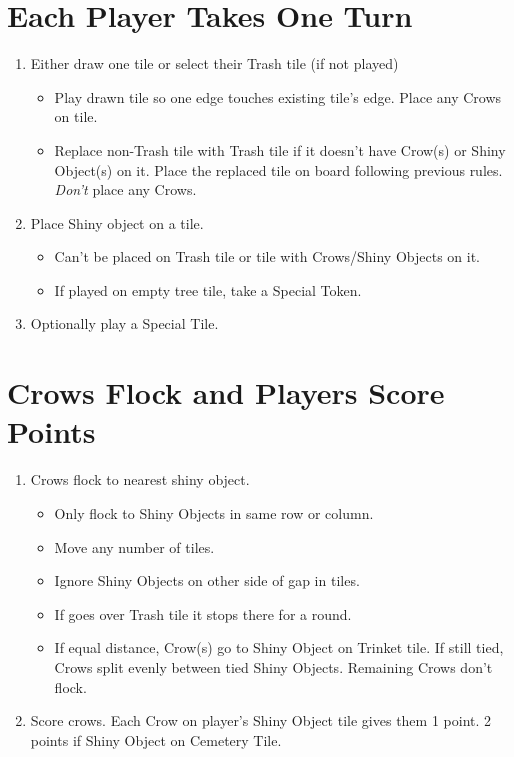\documentclass[12pt]{article}
\newenvironment{enumerateCustom}
{\begin{enumerate}
  \setlength{\itemsep}{1pt}
  \setlength{\parskip}{0pt}
  \setlength{\parsep}{0pt}}
{\end{enumerate}}
\newenvironment{itemizeCustom}
{\begin{itemize}
  \setlength{\itemsep}{1pt}
  \setlength{\parskip}{0pt}
  \setlength{\parsep}{0pt}}
{\end{itemize}}
\begin{document}
\begin{mdframed}[style = customFrame]
\begin{multicols*}{2}
\section*{Each Player Takes One Turn}
\begin{enumerateCustom}
	\item Either draw one tile or select their Trash tile (if not played)
		\begin{itemizeCustom}
			\item Play drawn tile so one edge touches existing tile's edge. Place any Crows on tile.
			\item Replace non-Trash tile with Trash tile if it doesn't have Crow(s) or Shiny Object(s) on it. Place the replaced tile on board following previous rules. \emph{Don't} place any Crows.
		\end{itemizeCustom}
	\item Place Shiny object on a tile.
		\begin{itemizeCustom}
			\item Can't be placed on Trash tile or tile with Crows/Shiny Objects on it.
			\item If played on empty tree tile, take a Special Token.
		\end{itemizeCustom}
	\item Optionally play a Special Tile.
\end{enumerateCustom}

\section*{Crows Flock and Players Score Points}
\begin{enumerateCustom}
	\item Crows flock to nearest shiny object.
		\begin{itemizeCustom}
			\item Only flock to Shiny Objects in same row or column.
			\item Move any number of tiles.
			\item Ignore Shiny Objects on other side of gap in tiles.
			\item If goes over Trash tile it stops there for a round.
			\item If equal distance, Crow(s) go to Shiny Object on Trinket tile. If still tied, Crows split evenly between tied Shiny Objects. Remaining Crows don't flock.
		\end{itemizeCustom}
	\item Score crows. Each Crow on player's Shiny Object tile gives them 1 point. 2 points if Shiny Object on Cemetery Tile.
\end{enumerateCustom}


\end{multicols*}
\end{mdframed}
\end{document}
